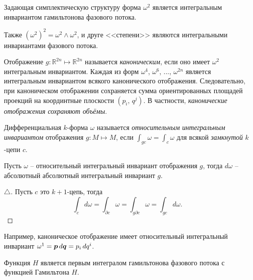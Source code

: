\begin{to_thr}
    Задающая симплектическую структуру форма $\omega^2$ является интегральным инвариантом гамильтонова фазового потока. 
\end{to_thr}


Также $(\omega^2)^2 = \omega^2 \wedge \omega^2$, и друге <<степени>> являются интегральными инвариантами фазового потока. 

\begin{to_def}
    Отображение $g \colon  \mathbb{R}^{2n} \mapsto \mathbb{R}^{2n}$ называется \textit{каноническим}, если оно имеет $\omega^2$ интегральным инвариантом. Каждая из форм $\omega^4$, $\omega^6$, ..., $\omega^{2n}$ является интегральным инвариантом всякого канонического отображения. Следовательно, при каноническом отображении сохраняется сумма ориентированных площадей проекций на координтные плоскости $(p_i,\, q^j)$. В частности, \textit{канонические отображения сохраняют объёмы}. 
\end{to_def}


\begin{to_def}
    Дифференциальная $k$-форма $\omega$ называется \textit{относительным интегральным инвариантом} отображения $g \colon  M \mapsto M$, если $\int_{gc} \omega = \int_c\omega$ для всякой \textit{замкнутой} $k$-цепи $c$. 
\end{to_def}


\begin{to_thr}[]
    Пусть $\omega$ -- относительный интегральный инвариант отображения $g$, тогда $d \omega$ -- абсолютный абсолютный интегральный инвариант $g$. 
\end{to_thr}

\begin{proof}[$\triangle$]
 Пусть $c$ это $k+1$-цепь, тогда
 \begin{equation*}
     \int_c d \omega = \int_{\partial c} \omega = \int_{g \partial c} \omega = \int_{g c} d \omega.
 \end{equation*}
\end{proof}



Например, каноническое отображение имеет относительный интегральный инвариант $\omega^1 = \mbox{\boldmath $p$} \, d \mbox{\boldmath $q$} = p_i \, d q^i$. 


\begin{to_thr}
    Функция $H$ является первым интегралом гамильтонова фазового потока с функцией Гамильтона $H$. 
\end{to_thr}

